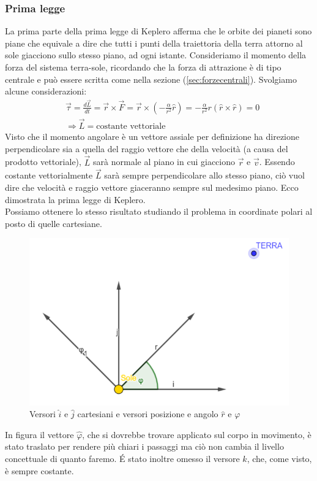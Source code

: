 \documentclass[10pt,a4paper]{article}
\begin{document}
\subsubsection{Prima legge}
La prima parte della prima legge di Keplero afferma che le orbite dei pianeti sono piane che equivale a dire che tutti i punti della traiettoria della terra attorno al sole giacciono sullo stesso piano, ad ogni istante. Consideriamo il momento della forza del sistema terra-sole, ricordando che la forza di attrazione è di tipo centrale e può essere scritta come nella sezione (\ref{sec:forzecentrali}). Svolgiamo alcune considerazioni:
\begin{align*}
&\vec{\tau} = \frac{d\vec{L}}{dt} = \vec{r}\times \vec{F} = \vec{r}\times (-\frac{\alpha}{r^2}\hat{r}) = -\frac{\alpha}{r^2}r( \hat{r}\times \hat{r}) = 0\\
&\Rightarrow \vec{L} = \text{costante vettoriale}
\end{align*}
Visto che il momento angolare è un vettore assiale per definizione ha direzione perpendicolare sia a quella del raggio vettore che della velocità (a causa del prodotto vettoriale), $\vec{L}$ sarà normale al piano in cui giacciono $\vec{r}$ e $\vec{v}$. Essendo costante vettorialmente $\vec{L}$ sarà sempre perpendicolare allo stesso piano, ciò vuol dire che velocità e raggio vettore giaceranno sempre sul medesimo piano. Ecco dimostrata la prima legge di Keplero.\\
Possiamo ottenere lo stesso risultato studiando il problema in coordinate polari al posto di quelle cartesiane. \\
\begin{figure}[h!]
	\centering
	\includegraphics[width=0.4\linewidth]{../images/polarcoordinates}
	\caption{Versori $\hat{i}$ e $\hat{j}$ cartesiani e versori posizione e angolo $\hat{r}$ e $\varphi$}
	\label{fig:polarcoordinates}
\end{figure}\FloatBarrier
In figura il vettore $\hat{\varphi}$, che si dovrebbe trovare applicato sul corpo in movimento, è stato traslato per rendere più chiari i passaggi ma ciò non cambia il livello concettuale di quanto faremo. \'{E} stato inoltre omesso il versore $\hat{k}$, che, come visto, è sempre costante.\\
\end{document}
